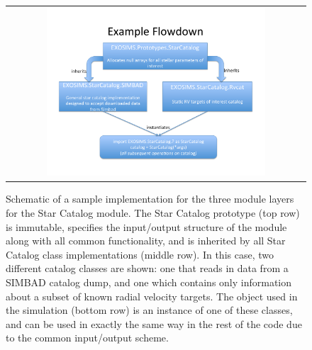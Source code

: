 \documentclass[cleanfoot]{asme2ej}
\begin{document}
\begin{figure}[ht]
    \begin{center}
        \begin{tabular}{c}
             \includegraphics[width=0.75\textwidth]{starcatalog_flowdown}
        \end{tabular}
    \end{center}
    \caption{Schematic of a sample implementation for the three module layers for the Star Catalog module. The Star Catalog prototype (top row) is immutable, specifies the input/output structure of the module along with all common functionality, and is inherited by all Star Catalog class implementations (middle row).  In this case, two different catalog classes are shown: one that reads in data from a SIMBAD catalog dump, and one which contains only information about a subset of known radial velocity targets.  The object used in the simulation (bottom row) is an instance of one of these classes, and can be used in exactly the same way in the rest of the code due to the common input/output scheme.}
    \label{fig:starcatalog_flowdown}
\end{figure}
\end{document}
